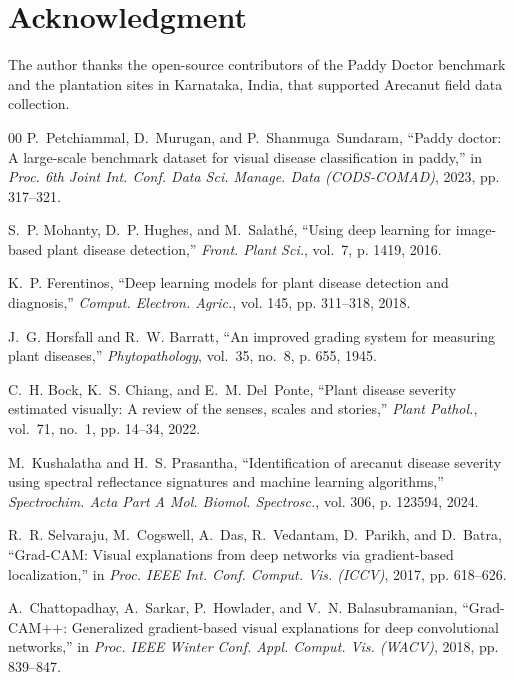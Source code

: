 \documentclass[conference]{IEEEtran}
\begin{document}
\section*{Acknowledgment}
The author thanks the open-source contributors of the Paddy Doctor benchmark and the plantation sites in Karnataka, India, that supported Arecanut field data collection.

\begin{thebibliography}{00}
P.~Petchiammal, D.~Murugan, and P.~Shanmuga~Sundaram, ``Paddy doctor: A large-scale benchmark dataset for visual disease classification in paddy,'' in \emph{Proc. 6th Joint Int. Conf. Data Sci. Manage. Data (CODS-COMAD)}, 2023, pp. 317--321.

S.~P. Mohanty, D.~P. Hughes, and M.~Salath{\'e}, ``Using deep learning for image-based plant disease detection,'' \emph{Front. Plant Sci.}, vol.~7, p. 1419, 2016.

K.~P. Ferentinos, ``Deep learning models for plant disease detection and diagnosis,'' \emph{Comput. Electron. Agric.}, vol. 145, pp. 311--318, 2018.

J.~G. Horsfall and R.~W. Barratt, ``An improved grading system for measuring plant diseases,'' \emph{Phytopathology}, vol.~35, no.~8, p. 655, 1945.

C.~H. Bock, K.~S. Chiang, and E.~M. Del~Ponte, ``Plant disease severity estimated visually: A review of the senses, scales and stories,'' \emph{Plant Pathol.}, vol.~71, no.~1, pp. 14--34, 2022.

M.~Kushalatha and H.~S. Prasantha, ``Identification of arecanut disease severity using spectral reflectance signatures and machine learning algorithms,'' \emph{Spectrochim. Acta Part A Mol. Biomol. Spectrosc.}, vol. 306, p. 123594, 2024.

R.~R. Selvaraju, M.~Cogswell, A.~Das, R.~Vedantam, D.~Parikh, and D.~Batra, ``Grad-CAM: Visual explanations from deep networks via gradient-based localization,'' in \emph{Proc. IEEE Int. Conf. Comput. Vis. (ICCV)}, 2017, pp. 618--626.

A.~Chattopadhay, A.~Sarkar, P.~Howlader, and V.~N. Balasubramanian, ``Grad-CAM++: Generalized gradient-based visual explanations for deep convolutional networks,'' in \emph{Proc. IEEE Winter Conf. Appl. Comput. Vis. (WACV)}, 2018, pp. 839--847.


\end{thebibliography}
\end{document}

